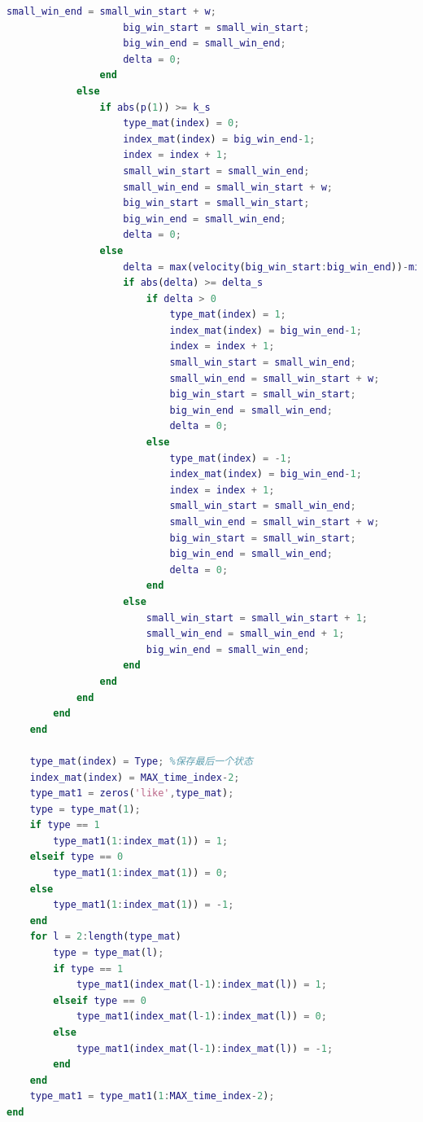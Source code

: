 \documentclass{my_paper}
\begin{document}
\begin{lstlisting}[language=matlab]
                    small_win_end = small_win_start + w;
                    big_win_start = small_win_start;
                    big_win_end = small_win_end;
                    delta = 0;
                end
            else
                if abs(p(1)) >= k_s 
                    type_mat(index) = 0;
                    index_mat(index) = big_win_end-1;
                    index = index + 1;
                    small_win_start = small_win_end;
                    small_win_end = small_win_start + w;
                    big_win_start = small_win_start;
                    big_win_end = small_win_end;
                    delta = 0;            
                else 
                    delta = max(velocity(big_win_start:big_win_end))-min(velocity(big_win_start:big_win_end));
                    if abs(delta) >= delta_s
                        if delta > 0
                            type_mat(index) = 1;
                            index_mat(index) = big_win_end-1;
                            index = index + 1;
                            small_win_start = small_win_end;
                            small_win_end = small_win_start + w;
                            big_win_start = small_win_start;
                            big_win_end = small_win_end;
                            delta = 0;   
                        else
                            type_mat(index) = -1;
                            index_mat(index) = big_win_end-1;
                            index = index + 1;
                            small_win_start = small_win_end;
                            small_win_end = small_win_start + w;
                            big_win_start = small_win_start;
                            big_win_end = small_win_end;
                            delta = 0;
                        end
                    else
                        small_win_start = small_win_start + 1;
                        small_win_end = small_win_end + 1;
                        big_win_end = small_win_end; 
                    end
                end
            end
        end
    end
        
    type_mat(index) = Type; %保存最后一个状态
    index_mat(index) = MAX_time_index-2;
    type_mat1 = zeros('like',type_mat);
    type = type_mat(1);
    if type == 1
        type_mat1(1:index_mat(1)) = 1;
    elseif type == 0
        type_mat1(1:index_mat(1)) = 0;
    else
        type_mat1(1:index_mat(1)) = -1;
    end
    for l = 2:length(type_mat)
        type = type_mat(l);
        if type == 1
            type_mat1(index_mat(l-1):index_mat(l)) = 1;
        elseif type == 0
            type_mat1(index_mat(l-1):index_mat(l)) = 0;
        else
            type_mat1(index_mat(l-1):index_mat(l)) = -1;
        end
    end
    type_mat1 = type_mat1(1:MAX_time_index-2);
end

\end{lstlisting}
\end{document}
